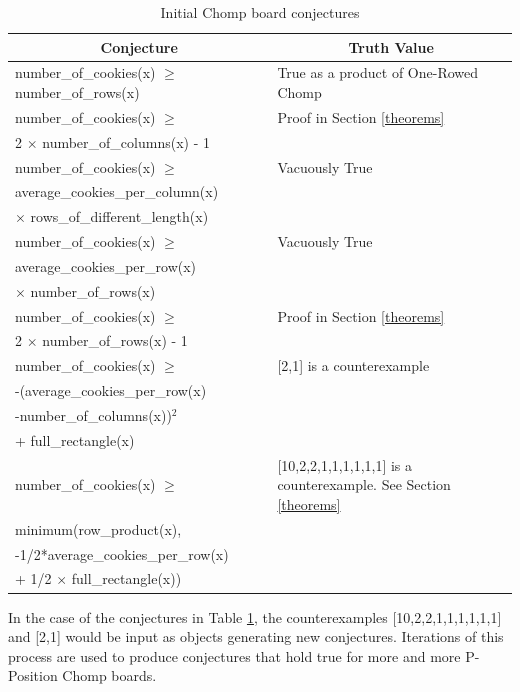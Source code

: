 \documentclass{amsart}
\theoremstyle{definition}
\theoremstyle{remark}
\numberwithin{equation}{section}
\begin{document}

\begin{table}[h]
\begin{tabular}{@{}|p{7cm}|p{7cm}|@{}}
\toprule
\multicolumn{1}{|c|}{{\bf Conjecture}} & \multicolumn{1}{|c|}{{\bf Truth Value}} \\ \midrule
number\_of\_cookies(x) $\geq$ number\_of\_rows(x) & True as a product of One-Rowed Chomp\cite{Gale74}\\
\hline
number\_of\_cookies(x) $\geq$  & Proof in Section \ref{theorems} \\
2 $\times$ number\_of\_columns(x) - 1 &\\
\hline
number\_of\_cookies(x) $\geq$ & Vacuously True \\ average\_cookies\_per\_column(x) &\\ $\times$ rows\_of\_different\_length(x) & \\
\hline
number\_of\_cookies(x) $\geq$  & Vacuously True  \\ average\_cookies\_per\_row(x) &\\ $\times$ number\_of\_rows(x) &\\
\hline
number\_of\_cookies(x) $\geq$  & Proof in Section \ref{theorems} \\  2 $\times$ number\_of\_rows(x) - 1 & \\
\hline
number\_of\_cookies(x) $\geq$ & [2,1] is a counterexample \\ -(average\_cookies\_per\_row(x)  & \\ -number\_of\_columns(x))$^2$ & \\ + full\_rectangle(x) &   \\
\hline
number\_of\_cookies(x) $\geq$ & [10,2,2,1,1,1,1,1,1] is a counterexample. See Section \ref{theorems} \\  minimum(row\_product(x), & \\ -1/2*average\_cookies\_per\_row(x) & \\ + 1/2 $\times$ full\_rectangle(x)) & \\
\hline
\end{tabular}
\caption{Initial Chomp board conjectures}
\label{initial_conjectures}
\end{table}

In the case of the conjectures in Table \ref{initial_conjectures}, the counterexamples [10,2,2,1,1,1,1,1,1] and [2,1] would be input as objects generating new conjectures. Iterations of this process are used to produce conjectures that hold true for more and more P-Position Chomp boards. 
\end{document}
